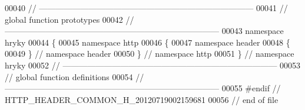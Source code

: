 \begin{DoxyCode}
00040 \textcolor{comment}{//
      ------------------------------------------------------------------------------}
00041 \textcolor{comment}{// global function prototypes}
00042 \textcolor{comment}{//
      ------------------------------------------------------------------------------}
00043 \textcolor{keyword}{namespace }hryky
00044 \{
00045 \textcolor{keyword}{namespace }http
00046 \{
00047 \textcolor{keyword}{namespace }header
00048 \{
00049 \} \textcolor{comment}{// namespace header}
00050 \} \textcolor{comment}{// namespace http}
00051 \} \textcolor{comment}{// namespace hryky}
00052 \textcolor{comment}{//
      ------------------------------------------------------------------------------}
00053 \textcolor{comment}{// global function definitions}
00054 \textcolor{comment}{//
      ------------------------------------------------------------------------------}
00055 \textcolor{preprocessor}{#endif // HTTP\_HEADER\_COMMON\_H\_20120719002159681}
00056 \textcolor{preprocessor}{}\textcolor{comment}{// end of file}
\end{DoxyCode}
